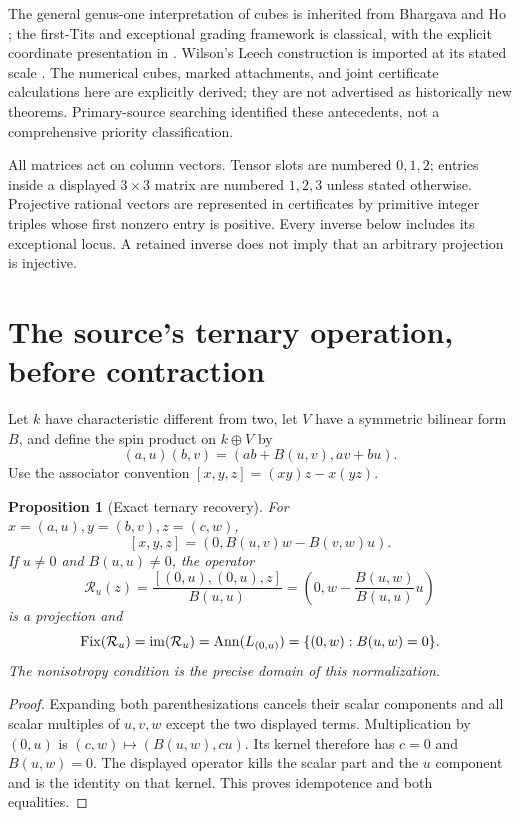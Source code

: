 \documentclass[11pt,reqno]{amsart}
\newtheorem{proposition}[theorem]{Proposition}
\theoremstyle{definition}\newtheorem{definition}[theorem]{Definition}
\theoremstyle{remark}\newtheorem{remark}[theorem]{Remark}
\begin{document}
The general genus-one interpretation of cubes is inherited from Bhargava and Ho
\cite[\S\S3.2.2--3.2.3, 5.1.1]{BH}; the first-Tits and exceptional grading
framework is classical, with the explicit coordinate presentation in
\cite[\S\S5--6 and Appendix A]{BP}. Wilson's Leech construction is imported at
its stated scale \cite[\S\S2--4]{Wilson}. The numerical cubes, marked attachments,
and joint certificate calculations here are explicitly derived; they are not
advertised as historically new theorems. Primary-source searching identified
these antecedents, not a comprehensive priority classification.

All matrices act on column vectors. Tensor slots are numbered $0,1,2$; entries
inside a displayed $3\times3$ matrix are numbered $1,2,3$ unless stated otherwise.
Projective rational vectors are represented in certificates by primitive integer
triples whose first nonzero entry is positive. Every inverse below includes its
exceptional locus. A retained inverse does not imply that an arbitrary projection
is injective.

\section{The source's ternary operation, before contraction}

Let $k$ have characteristic different from two, let $V$ have a symmetric bilinear
form $B$, and define the spin product on $k\oplus V$ by
\[
 (a,u)(b,v)=(ab+B(u,v),av+bu).
\]
Use the associator convention $[x,y,z]=(xy)z-x(yz)$.

\begin{proposition}[Exact ternary recovery]\label{prop:recovery}
For $x=(a,u),y=(b,v),z=(c,w)$,
\[
 [x,y,z]=(0,B(u,v)w-B(v,w)u).
\]
If $u\ne0$ and $B(u,u)\ne0$, the operator
\[
 \mathcal R_u(z)=\frac{[(0,u),(0,u),z]}{B(u,u)}
 =\left(0,w-\frac{B(u,w)}{B(u,u)}u\right)
\]
is a projection and
\[
 \operatorname{Fix}(\mathcal R_u)=\operatorname{im}(\mathcal R_u)
 =\operatorname{Ann}(L_{(0,u)})=\{(0,w):B(u,w)=0\}.
\]
The nonisotropy condition is the precise domain of this normalization.
\end{proposition}
\begin{proof}
Expanding both parenthesizations cancels their scalar components and all scalar
multiples of $u,v,w$ except the two displayed terms. Multiplication by $(0,u)$
is $(c,w)\mapsto(B(u,w),cu)$. Its kernel therefore has $c=0$ and $B(u,w)=0$.
The displayed operator kills the scalar part and the $u$ component and is the
identity on that kernel. This proves idempotence and both equalities.
\end{proof}
\end{document}
